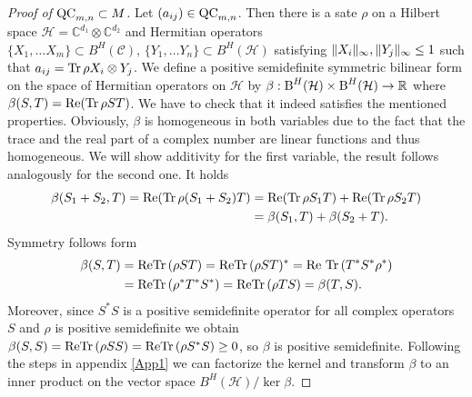 \begin{proof}[Proof of $ \textup{QC}_{m,n} \subset M $]
	Let $ (a_{ij}) \in \textup{QC}_{m,n} $. Then there is a sate $ \rho $ on a Hilbert space $ \mathcal{H} = \mathbb{C}^{d_1} \otimes\mathbb{C}^{d_2} $ and Hermitian operators $ \{X_1,\hdots X_m\}\subset  B^H(\mathcal{C}), \, \{Y_1,\hdots Y_n\}\subset B^H(\mathcal{H}) $ satisfying $  \Vert {X_i} \Vert_{\infty},  \Vert {Y_j} \Vert_{\infty} \le 1 $ such that 
	$ a_{ij} = \textup{Tr} \, {\rho X_i \otimes Y_j}  $.
	We define a positive semidefinite symmetric bilinear form on the space of Hermitian operators on $ \mathcal{H} $ by 
	$ \beta: \textup{B}^{H}(\mathcal{H}) \times \textup{B}^{H}(\mathcal{H}) \to \mathbb{R} $ where $ \beta(S,T) =\textup{Re}( \textup{Tr} \, {\rho ST} ) $.
	We have to check that it indeed satisfies the mentioned properties. 
	Obviously, $ \beta $ is homogeneous in both variables due to the fact that the trace and the real part of a complex number are linear functions and thus homogeneous. We will show additivity for the first variable, the result follows analogously for the second one. It holds
	\begin{align*}
		\beta(S_1+S_2,T) = \textup{Re}(\textup{Tr} \, {\rho(S_1+S_2)T} ) &= \textup{Re}(\textup{Tr} \, {\rho S_1T} ) + \textup{Re}(\textup{Tr} \, {\rho S_2T} ) \\
		&= \beta(S_1,T)+ \beta(S_2+T).
	\end{align*}
	Symmetry follows form 
	\begin{align*}
		\beta(S,T)&= \textup{Re}\textup{Tr} \, {(\rho ST)}  =\textup{Re}\textup{Tr} \, {(\rho ST)^*}   = \textup{Re \ensuremath{\textup{Tr} \, {(T^*S^* \rho^*} })}  \\
		 &=\textup{Re} \textup{Tr} \, {(\rho^* T^*S^*)}  = \textup{Re} \textup{Tr} \, {(\rho T S)}  = \beta(T,S).
	\end{align*}
	Moreover, since $ S^*S $ is a positive semidefinite operator for all complex operators $ S $ and $  \rho $ is positive semidefinite we obtain $ \beta(S,S) = \textup{Re}\textup{Tr} \, {(\rho SS)}  = \textup{Re} \textup{Tr} \, {(\rho S^*S)}  \ge 0 $, so $ \beta $ is positive semidefinite. 
	Following the steps in appendix \ref{App1} we can factorize the kernel and transform $ \beta $ to an inner product on the vector space $ B^H(\mathcal{H})/ \ker{\beta} $. 
	

\end{proof}
